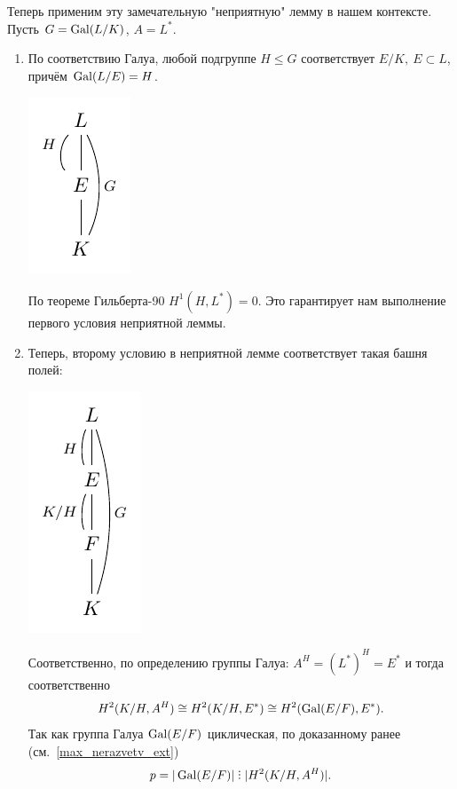 	  Теперь применим эту замечательную "неприятную" лемму в нашем контексте. Пусть $G = \operatorname{Gal}(L/K)$, $A = L^*$. 

	  \begin{enumerate}
	  	\item По соответствию Галуа, любой подгруппе $H \le G$ соответствует $E/K, \ E \subset L$, причём $\operatorname{Gal}(L/E) = H$. 

	  	\begin{center}
	  		\includegraphics{lectures/6/pictures/cd_27.pdf}
	  	\end{center}

	  	По теореме Гильберта-90 $H^1(H, L^*) = 0$. Это гарантирует нам выполнение первого условия неприятной леммы. 

	  	\item Теперь, второму условию в неприятной лемме соответствует такая башня полей: 
	  	\begin{center}
	  		\includegraphics{lectures/6/pictures/cd_28.pdf}
	  	\end{center}

	  	Соответственно, по определению группы Галуа: $A^H = (L^*)^H = E^*$ и тогда соответственно 
	  	\[
	  		H^2(K/H, A^H) \cong H^2(K/H, E^*) \cong H^2(\operatorname{Gal}(E/F), E^*).
	  	\]
	  	Так как группа Галуа $\operatorname{Gal}(E/F)$ циклическая, по доказанному ранее (см.~\ref{max_nerazvetv_ext})
	  	\[
			p = |\Gal(E/F)|	  \divby |H^2(K/H, A^H)|.		
	  	\]
	  \end{enumerate}

